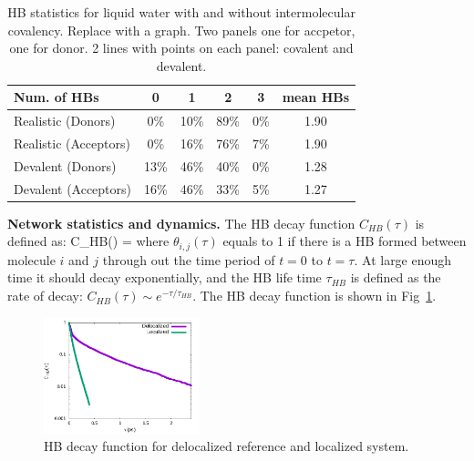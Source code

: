\documentclass[prl,twocolumn,showpacs]{revtex4}
\begin{document}
\begin{table}
\caption{HB statistics for liquid water with and without intermolecular covalency. \new Replace with a graph. Two panels one for accpetor, one for donor. 2 lines with points on each panel: covalent and devalent.\old }\label{HBstat}
\begin{tabular}{l|*{5}{c}}
\hline
Num. of HBs              & 0 & 1 & 2 & 3 &mean HBs \\
\hline
Realistic (Donors)             & 0\% & 10\% & 89\% & 0\% & 1.90 \\
Realistic (Acceptors)             & 0\% & 16\% & 76\% & 7\% & 1.90 \\
Devalent (Donors)               & 13\% & 46\% & 40\% & 0\% & 1.28  \\
Devalent (Acceptors)               & 16\% & 46\% & 33\% & 5\% & 1.27
\end{tabular}
\end{table}

\textbf{Network statistics and dynamics.} The HB decay function $C_{HB}(\tau)$ is defined as:
\bea
C_{HB}(\tau) =  \label{Eq:HBdecay}
\eea
where $\theta_{i,j}(\tau)$ equals to 1 if there is a HB formed between molecule $i$ and $j$ through out the time period of $t=0$ to $t=\tau$. At large enough time it should decay exponentially, and the HB life time $\tau_{HB}$ is defined as the rate of decay: $C_{HB}(\tau) \sim e^{-\tau/\tau_{HB}}$. The HB decay function is shown in Fig~\ref{Fig:HBdecay}.

\begin{figure}
\includegraphics[width=0.4\textwidth]{HB_decay}
\caption{HB decay function for delocalized reference and localized system.} \label{Fig:HBdecay}
\end{figure}
\end{document}
